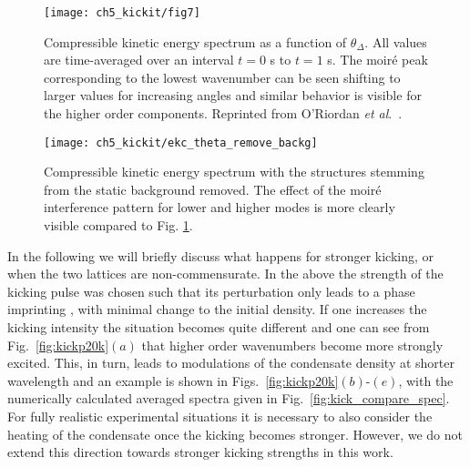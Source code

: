 
	\begin{figure}
        \centering
		\texttt{[image: ch5\_kickit/fig7]}
		\caption[Compressible kinetic energy spectrum as a function of $\theta_\Delta$.]{Compressible kinetic energy spectrum as a function of $\theta_\Delta$. All values are time-averaged over an interval $t=0$ s to $t=1$ s. The moir\'e peak corresponding to the lowest wavenumber can be seen shifting to larger values for increasing angles and similar behavior is visible for the higher order components. Reprinted from O'Riordan {\textit{et al}.}~\cite{VTX:oriordan_pra_2016}.}
		\label{fig:dtheta_kspec}
	\end{figure}
    \begin{figure}
        \centering
        \texttt{[image: ch5\_kickit/ekc\_theta\_remove\_backg]}
        \caption[Compressible kinetic energy spectrum with the background structure removed.]{Compressible kinetic energy spectrum with the structures stemming from the static background removed. The effect of the moir\'e interference pattern for lower and higher modes is more clearly visible compared to Fig. \ref{fig:dtheta_kspec}.}
        \label{fig:dtheta_kspec_backg}
    \end{figure}

    In the following we will briefly discuss what happens for stronger kicking, or when the two lattices are non-commensurate. In the above the strength of the kicking pulse was chosen such that its perturbation only leads to a phase imprinting \cite{Vtx:Dobrek_pra_1999,BEC:Denschlag_science_2000}, with minimal change to the initial density. If one increases the kicking intensity the situation becomes quite different and one can see from Fig.~\ref{fig:kickp20k}$(a)$ that higher order wavenumbers become more strongly excited. This, in turn, leads to modulations of the condensate density at shorter wavelength and an example is shown in Figs.~\ref{fig:kickp20k}$(b)$-$(e)$, with the numerically calculated averaged spectra given in Fig.~\ref{fig:kick_compare_spec}. For fully realistic experimental situations it is necessary to also consider the heating of the condensate once the kicking becomes stronger. However, we do not extend this direction towards stronger kicking strengths in this work.


